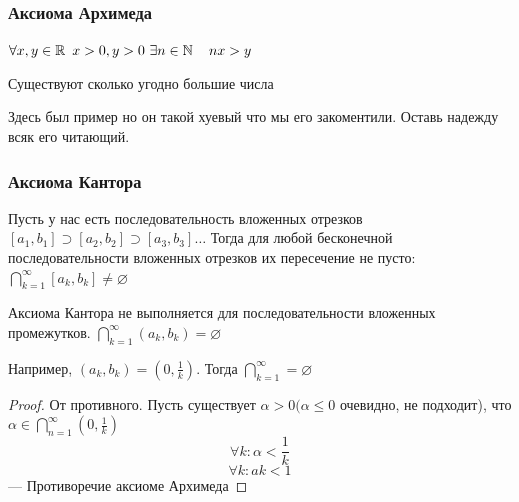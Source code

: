 	\subsubsection*{ Аксиома Архимеда}
  	$ \forall x,y \in \operatorname*{\mathbb{R}} ~x > 0, y > 0 ~ \exists n \in \operatorname*{\mathbb{N}} \quad nx > y$
   	   	
  	\begin{consequence}
  		Существуют сколько угодно большие числа
  	\end{consequence}
    
  	\begin{example}
  	    Здесь был пример но он такой хуевый что мы его закоментили. Оставь надежду всяк его читающий.
   	
  	\end{example}
   	
  	\subsubsection*{Аксиома Кантора}
   	
  	Пусть у нас есть последовательность вложенных отрезков $ [a_1,b_1] \supset [a_2, b_2] \supset [a_3, b_3] \ldots $ Тогда для любой бесконечной последовательности вложенных отрезков их пересечение не пусто:
  	$ \bigcap\limits_{k = 1}^{\infty} [a_k, b_k] \neq \varnothing $ 	

	\begin{remark}
	Аксиома Кантора не выполняется для последовательности вложенных промежутков.
	$ \bigcap\limits_{k = 1}^{\infty} (a_k, b_k) = \varnothing $ 	
	
	Например, $(a_k, b_k) = (0, \frac{1}{k}).$ Тогда $\bigcap\limits_{k=1}^{\infty} = \varnothing $
		\begin{proof}
			От противного. Пусть существует $\alpha > 0 (\alpha \le 0$ очевидно, не подходит), что $ \alpha \in \bigcap\limits_{n=1}^{\infty} \left(0, \frac{1}{k}  \right)$ %
			$$\forall k : \alpha < \frac{1}{k}$$ 
			$$\forall k: ak < 1$$ --- Противоречие аксиоме Архимеда
		\end{proof}	
	\end{remark}

